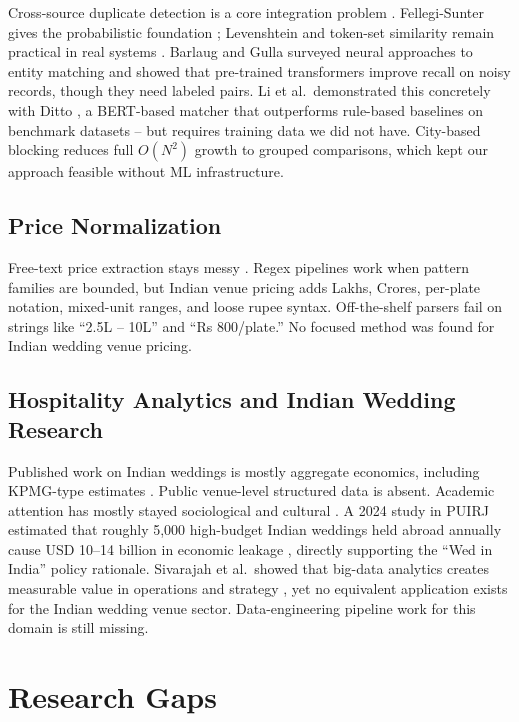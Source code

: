\documentclass[conference]{IEEEtran}
\begin{document}
Cross-source duplicate detection is a core integration problem \cite{b4}. Fellegi-Sunter gives the probabilistic foundation \cite{b5}; Levenshtein and token-set similarity remain practical in real systems \cite{b6}. Barlaug and Gulla surveyed neural approaches to entity matching \cite{b12} and showed that pre-trained transformers improve recall on noisy records, though they need labeled pairs. Li et al.\ demonstrated this concretely with Ditto \cite{b13}, a BERT-based matcher that outperforms rule-based baselines on benchmark datasets -- but requires training data we did not have. City-based blocking reduces full $O(N^2)$ growth to grouped comparisons, which kept our approach feasible without ML infrastructure.

\subsection{Price Normalization}

Free-text price extraction stays messy \cite{b7}. Regex pipelines work when pattern families are bounded, but Indian venue pricing adds Lakhs, Crores, per-plate notation, mixed-unit ranges, and loose rupee syntax. Off-the-shelf parsers fail on strings like ``2.5L -- 10L'' and ``Rs 800/plate.'' No focused method was found for Indian wedding venue pricing.

\subsection{Hospitality Analytics and Indian Wedding Research}

Published work on Indian weddings is mostly aggregate economics, including KPMG-type estimates \cite{b1}. Public venue-level structured data is absent. Academic attention has mostly stayed sociological and cultural \cite{b8}. A 2024 study in PUIRJ estimated that roughly 5,000 high-budget Indian weddings held abroad annually cause USD 10--14 billion in economic leakage \cite{b14}, directly supporting the ``Wed in India'' policy rationale. Sivarajah et al.\ showed that big-data analytics creates measurable value in operations and strategy \cite{b15}, yet no equivalent application exists for the Indian wedding venue sector. Data-engineering pipeline work for this domain is still missing.

\section{Research Gaps}
\end{document}
